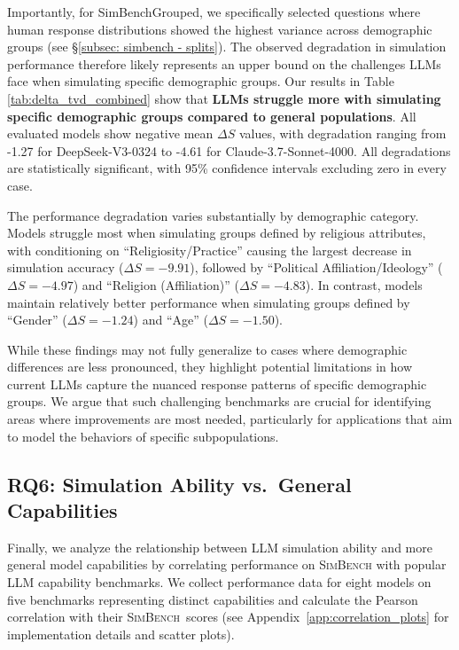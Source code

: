 \documentclass{article} %
\begin{document}
Importantly, for SimBenchGrouped, we specifically selected questions where human response distributions showed the highest variance across demographic groups (see \S\ref{subsec: simbench - splits}). The observed degradation in simulation performance therefore likely represents an upper bound on the challenges LLMs face when simulating specific demographic groups. Our results in Table \ref{tab:delta_tvd_combined} show that \textbf{LLMs struggle more with simulating specific demographic groups compared to general populations}. All evaluated models show negative mean $\Delta S$ values, with degradation ranging from -1.27 for DeepSeek-V3-0324 to -4.61 for Claude-3.7-Sonnet-4000. All degradations are statistically significant, with 95\% confidence intervals excluding zero in every case.


The performance degradation varies substantially by demographic category. Models struggle most when simulating groups defined by religious attributes, with conditioning on ``Religiosity/Practice'' causing the largest decrease in simulation accuracy ($\Delta S = -9.91$), followed by ``Political Affiliation/Ideology'' ($\Delta S = -4.97$) and ``Religion (Affiliation)'' ($\Delta S = -4.83$). In contrast, models maintain relatively better performance when simulating groups defined by ``Gender'' ($\Delta S = -1.24$) and ``Age'' ($\Delta S = -1.50$).


While these findings may not fully generalize to cases where demographic differences are less pronounced, they highlight potential limitations in how current LLMs capture the nuanced response patterns of specific demographic groups. We argue that such challenging benchmarks are crucial for identifying areas where improvements are most needed, particularly for applications that aim to model the behaviors of specific subpopulations.



\subsection{RQ6: Simulation Ability vs.\ General Capabilities}
\label{sec:simulation_vs_capabilities}

Finally, we analyze the relationship between LLM simulation ability and more general model capabilities by correlating performance on \textsc{SimBench} with popular LLM capability benchmarks. We collect performance data for eight models on five benchmarks representing distinct capabilities and calculate the Pearson correlation with their \textsc{SimBench}\ scores (see Appendix~\ref{app:correlation_plots} for implementation details and scatter plots).
\end{document}
